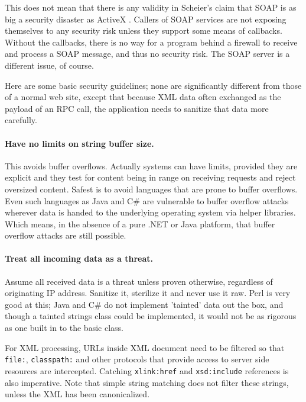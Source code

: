 \documentclass[draft]{report}
\begin{document}
This does not mean that there is any validity in Scheier's claim that
SOAP is as big a security disaster as ActiveX
\cite{schneier:cryptogram200204}. Callers of SOAP services are not
exposing themselves to any security risk unless they support some means
of callbacks. Without the callbacks, there is no way for a program
behind a firewall to receive and process a SOAP message, and thus no
security risk. The SOAP server is a different issue, of course.

Here are some basic security guidelines; none are significantly
different from those of a normal web site, except that because XML data
often exchanged as the payload of an RPC call, the application needs to
sanitize that data more carefully.

\paragraph{Have no limits on string buffer size.}

This avoids buffer overflows. Actually systems can have limits, provided
they are explicit and they test for content being in range on receiving
requests and reject oversized content. Safest is to avoid languages that
are prone to buffer overflows. Even such languages as Java and C\# are
vulnerable to buffer overflow attacks wherever data is handed to the
underlying operating system via helper libraries. Which means, in the
absence of a pure .NET or Java platform, that buffer overflow attacks
are still possible.

\paragraph{Treat all incoming data as a threat.}

Assume all received data is a threat unless proven otherwise, regardless
of originating IP address. Sanitize it, sterilize it and never use it
raw. Perl is very good at this; Java and C\# do not implement 'tainted'
data out the box, and though a tainted strings class could be
implemented, it would not be as rigorous as one built in to the basic
class.

For XML processing, URLs inside XML document need to be filtered so that
\verb$file:$, \verb$classpath:$ and other protocols that provide access
to server side resources are intercepted. Catching \verb$xlink:href$ and
\verb$xsd:include$ references is also imperative. Note that simple
string matching does not filter these strings, unless the XML has been
canonicalized.
\end{document}
